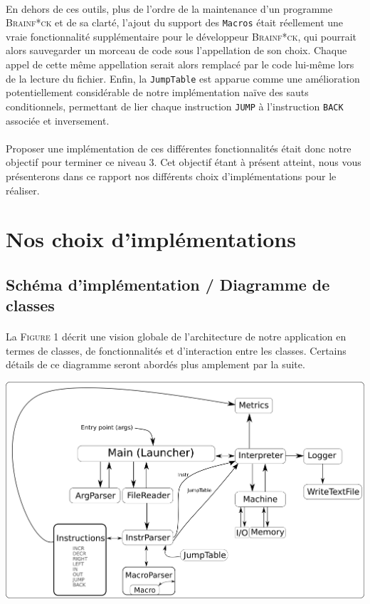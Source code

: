 \documentclass[a4paper]{article}
\begin{document}
\paragraph{}En dehors de ces outils, plus de l'ordre de la maintenance d'un programme \textsc{Brainf*ck} et de sa clarté, l'ajout du support des \texttt{Macros} était réellement une vraie fonctionnalité supplémentaire pour le développeur \textsc{Brainf*ck}, qui pourrait alors sauvegarder un morceau de code sous l'appellation de son choix. Chaque appel de cette même appellation serait alors remplacé par le code lui-même lors de la lecture du fichier. Enfin, la \texttt{JumpTable} est apparue comme une amélioration potentiellement considérable de notre implémentation naïve des sauts conditionnels, permettant de lier chaque instruction \texttt{JUMP} à l'instruction \texttt{BACK} associée et inversement.
\paragraph{}Proposer une implémentation de ces différentes fonctionnalités était donc notre objectif pour terminer ce niveau 3. Cet objectif étant à présent atteint, nous vous présenterons dans ce rapport nos différents choix d'implémentations pour le réaliser.

\section{Nos choix d'implémentations}

\subsection{Schéma d'implémentation / Diagramme de classes}
\paragraph{}La \textsc{Figure 1} décrit une vision globale de l'architecture de notre application en termes de classes, de fonctionnalités et d'interaction entre les classes. Certains détails de ce diagramme seront abordés plus amplement par la suite.
\begin{center}
	\includegraphics[scale=0.7]{pres23.png}
\end{center}
\end{document}
